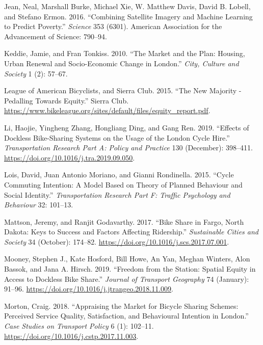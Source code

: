 \documentclass[]{article}
\begin{document}
\leavevmode\hypertarget{ref-jean_combining_2016}{}%
Jean, Neal, Marshall Burke, Michael Xie, W. Matthew Davis, David B. Lobell, and Stefano Ermon. 2016. ``Combining Satellite Imagery and Machine Learning to Predict Poverty.'' \emph{Science} 353 (6301). American Association for the Advancement of Science: 790--94.

\leavevmode\hypertarget{ref-keddie_market_2010}{}%
Keddie, Jamie, and Fran Tonkiss. 2010. ``The Market and the Plan: Housing, Urban Renewal and Socio-Economic Change in London.'' \emph{City, Culture and Society} 1 (2): 57--67.

\leavevmode\hypertarget{ref-league_of_american_bicyclists_new_2015}{}%
League of American Bicyclists, and Sierra Club. 2015. ``The New Majority - Pedalling Towards Equity.'' Sierra Club. \url{https://www.bikeleague.org/sites/default/files/equity_report.pdf}.

\leavevmode\hypertarget{ref-li_effects_2019}{}%
Li, Haojie, Yingheng Zhang, Hongliang Ding, and Gang Ren. 2019. ``Effects of Dockless Bike-Sharing Systems on the Usage of the London Cycle Hire.'' \emph{Transportation Research Part A: Policy and Practice} 130 (December): 398--411. \url{https://doi.org/10.1016/j.tra.2019.09.050}.

\leavevmode\hypertarget{ref-lois_cycle_2015}{}%
Lois, David, Juan Antonio Moriano, and Gianni Rondinella. 2015. ``Cycle Commuting Intention: A Model Based on Theory of Planned Behaviour and Social Identity.'' \emph{Transportation Research Part F: Traffic Psychology and Behaviour} 32: 101--13.

\leavevmode\hypertarget{ref-mattson_bike_2017}{}%
Mattson, Jeremy, and Ranjit Godavarthy. 2017. ``Bike Share in Fargo, North Dakota: Keys to Success and Factors Affecting Ridership.'' \emph{Sustainable Cities and Society} 34 (October): 174--82. \url{https://doi.org/10.1016/j.scs.2017.07.001}.

\leavevmode\hypertarget{ref-mooney_freedom_2019}{}%
Mooney, Stephen J., Kate Hosford, Bill Howe, An Yan, Meghan Winters, Alon Bassok, and Jana A. Hirsch. 2019. ``Freedom from the Station: Spatial Equity in Access to Dockless Bike Share.'' \emph{Journal of Transport Geography} 74 (January): 91--96. \url{https://doi.org/10.1016/j.jtrangeo.2018.11.009}.

\leavevmode\hypertarget{ref-morton_appraising_2018}{}%
Morton, Craig. 2018. ``Appraising the Market for Bicycle Sharing Schemes: Perceived Service Quality, Satisfaction, and Behavioural Intention in London.'' \emph{Case Studies on Transport Policy} 6 (1): 102--11. \url{https://doi.org/10.1016/j.cstp.2017.11.003}.
\end{document}

